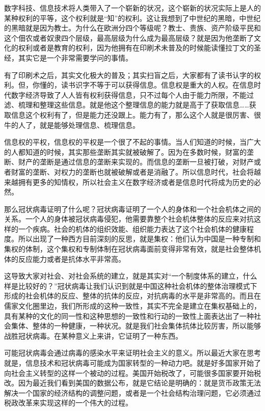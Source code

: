 \documentclass[UTF8, 12pt, a4paper]{ctexrep}
\begin{document}
数字科技、信息技术将人类带入了一个崭新的状况，这个崭新的状况实际上是人的某种权利的平等，这个权利就是“知”的权利。这让我想到了中世纪的黑暗，中世纪的黑暗就是因为教士。为什么在欧洲分四个等级呢？教士、贵族、资产阶级平民和这个佃农或者奴隶四个层级，最高层级为什么成为最高层级？就是因为他垄断了文化的权利或者是教育的权利，因为他拥有在印刷术未普及的时候能读懂拉丁文的圣经，其实它是一个非常需要学问的事情。

有了印刷术之后，其实文化极大的普及；其实扫盲之后，大家都有了读书认字的权利。但，你懂的，读书识字不等于可以获得信息。信息权是重大的人权。在信息时代数字经济导致了人人皆有权利获得信息，只不过每个人由于能力所限，不能过滤、梳理和整理这些信息。就是他这个整理信息的能力就是高于了获取信息……获取信息这个权利有了，但是能力还没跟上。能力有了，那么这个人就是很厉害、很牛的人了，就是能够处理信息、梳理信息。

信息权的平权，信息权的平权是一个很了不起的事情。当人们知道的时候，当广大的人都知道的时候，其实那些垄断其实就被破解了。因为在多数时候，财富的垄断、财产的垄断是通过信息的垄断来实现的。而信息的垄断一旦被打破，对财产或者财富的垄断、对权力的垄断也就被破解或者是消融了。所以信息时代，社会将越来越拥有更多的知情权，所以社会主义在数字经济或者是信息时代将成为历史的必然。

那么冠状病毒证明了什么呢？冠状病毒证明了一个人的身体和一个社会机体之间的关系。一个人的身体被冠状病毒侵犯，他需要靠整个社会机体整体的反应来对抗这样的一个疾病。社会的机体的组织效能、组织能力表达了这个社会机体的健康程度。所以出现了一种西方目前深刻的反思，就是集权：他们认为中国是一种专制和集权的体制，这个集权和专制体制在冠状病毒面前变得非常有效，就是社会整体机体的反应能力或者是抗体水平非常高。

这导致大家对社会、对社会系统的建立，就是其实对“一个制度体系的建立，什么样是比较好的？”冠状病毒让我们认识到就是中国这种社会机体的整体治理模式下形成的社会机体的反应、整体的抗体的反应，对抗病毒的水平是非常高的。而且在儒家文化圈里边，我们所形成的这种一致性，其实不完全是建立在集权基础上的，具有某种的文化的同一性和这种思想的一致性和行动的一致性上面表达出了一种社会集体、整体的一种健康，一种状况。就是我们社会集体抗体比较厉害，所以能够战胜冠状病毒。在某种意义上来讲，它证明了一种东西。

可能冠状病毒会通过病毒的感染水平来证明社会主义的意义。所以最近大家在思考就是，信息技术和冠状病毒可能成为国家转型的一种动力吧。就是好多国家开始了向社会主义转型的这样一个被动的过程。美国开始税改了，可能很多国家要开始税改。因为最近我们看到美国的数据公布，就是它结论是明确的：就是货币政策无法解决一个国家的经济结构的调整问题，或者是一个社会结构治理问题，它必须通过税政改革来实现这样的一个伟大的过程。
\end{document}
